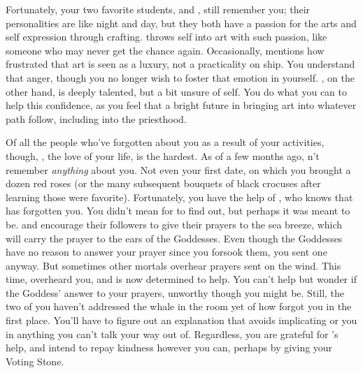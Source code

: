 \documentclass[char]{GL2020}
\begin{document}
Fortunately, your two favorite students, \cPirateChild{\full} and \cInitiate{\full}, still remember you; their personalities are like night and day, but they both have a passion for the arts and self expression through crafting. \cPirateChild{} throws \cPirateChild{\them}self into art with such passion, like someone who may never get the chance again. Occasionally, \cPirateChild{} mentions how frustrated \cPirateChild{\they} \cPirateChild{\are} that art is seen as a luxury, not a practicality on \cPirateChild{\their} ship. You understand that anger, though you no longer wish to foster that emotion in yourself. \cInitiate{}, on the other hand, is deeply talented, but a bit unsure of \cInitiate{\them}self. You do what you can to help this confidence, as you feel that \cInitiate{\they} \cInitiate{\have} a bright future in bringing art into whatever path \cInitiate{\they} follow, including into the priesthood.

Of all the people who've forgotten about you as a result of your activities, though, \cHeadScientist{}, the love of your life, is the hardest. As of a few months ago, \cHeadScientist{\they} \cHeadScientist{\do}n't remember \emph{anything} about you. Not even your first date, on which you brought \cHeadScientist{\them} a dozen red roses (or the many subsequent bouquets of black crocuses after learning those were \cHeadScientist{\their} favorite). Fortunately, you have the help of \cInitiate{}, who knows that \cHeadScientist{} has forgotten you. You didn't mean for \cInitiate{} to find out, but perhaps it was meant to be. \cEbb{} and \cFlow{} encourage their followers to give their prayers to the sea breeze, which will carry the prayer to the ears of the Goddesses. Even though the Goddesses have no reason to answer your prayer since you forsook them, you sent one anyway. But sometimes other mortals overhear prayers sent on the wind. This time, \cInitiate{} overheard you, and is now determined to help. You can't help but wonder if \cInitiate{\they} \cInitiate{\are} the Goddess' answer to your prayers, unworthy though you might be. Still, the two of you haven't addressed the whale in the room yet of how \cHeadScientist{} forgot you in the first place. You'll have to figure out an explanation that avoids implicating \cHeadScientist{} or you in anything you can't talk your way out of. Regardless, you are grateful for \cInitiate{}'s help, and intend to repay \cInitiate{\their} kindness however you can, perhaps by giving \cInitiate{\them} your Voting Stone.
\end{document}

